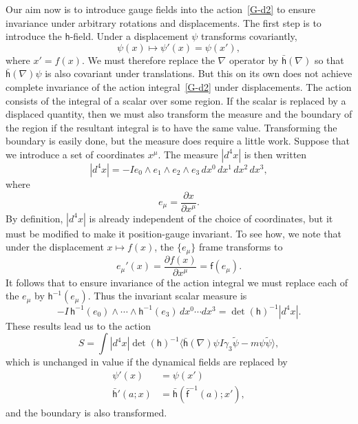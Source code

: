 \documentclass[a4paper]{article}
\numberwithin{equation}{section}
\newcommand{\wdg}{\! \wedge \!}
\newcommand{\la}{\langle}
\newcommand{\ra}{\rangle}
\newcommand{\eqv}{=}
\newcommand{\gk}{\gamma_{3}}
\newcommand{\psirev}{\tilde{\psi}}
\newcommand{\lif}{\mathsf{f}}
\newcommand{\lbf}{\bar{\mathsf{f}}}
\newcommand{\lih}{\mathsf{h}}
\newcommand{\lbh}{\bar{\mathsf{h}}}
\newcommand{\ho}{\lbh}
\newcommand{\hu}{\lih}
\newcommand{\fo}{\lbf}
\newcommand{\fu}{\lif}
\newcommand{\grad}{\nabla}
\newcommand{\deriv}[2]{\frac{\partial #1}{\partial #2}}
\newcommand{\dhi}{\det(\hu)^{-1}}
\begin{document}
Our aim now is to introduce gauge fields into the action~\eqref{G-d2} to
ensure invariance under arbitrary rotations and displacements.  
The first step is to introduce the $\lih$-field.  Under a displacement
$\psi$ transforms covariantly,
%
\begin{equation}
\psi(x) \mapsto \psi'(x) = \psi(x'),
\end{equation}
%
where $x'=f(x)$.  We must therefore replace the $\grad$ operator by
$\ho(\grad)$ so that $\ho(\grad)\psi$ is also covariant under
translations.  But this on its own does not achieve complete
invariance of the action integral~\eqref{G-d2} under displacements.
The action consists of the integral of a scalar over some region.  If
the scalar is replaced by a displaced quantity, then we must also
transform the measure and the boundary of the region if the resultant
integral is to have the same value.  Transforming the boundary is
easily done, but the measure does require a little work.  Suppose that
we introduce a set of coordinates $x^\mu$.  The measure $|d^4x|$ is
then written
%
\begin{equation}
|d^4x| = -I e_0 \wdg e_1 \wdg e_2 \wdg e_3 \, dx^0 \, dx^1\, dx^2\, dx^3,
\end{equation}
%
where
%
\begin{equation}
e_\mu \eqv \deriv{x}{x^\mu}.
\end{equation}
%
By definition, $|d^4x|$ is already independent of the choice of
coordinates, but it must be modified to make it position-gauge
invariant.  To see how, we note that under the displacement $x\mapsto
f(x)$, the $\{e_\mu\}$ frame transforms to
%
\begin{equation}
e_\mu' (x) = \deriv{f(x)}{x^\mu} = \fu(e_\mu).
\end{equation}
%
It follows that to ensure invariance of the action integral we must
replace each of the $e_\mu$ by $\hu^{-1}(e_\mu)$.  Thus the invariant
scalar measure is
%
\begin{equation}
-I \, \hu^{-1}(e_0) \wdg \cdots \wdg
\hu^{-1}(e_3) \, dx^0 \cdots dx^3 = \dhi |d^4x|.
\end{equation}
%
These results lead us to the action
%
\begin{equation}
S= \int |d^4 x| \dhi \la \ho(\grad) \psi I\gk \psirev - m
\psi \psirev \ra ,
\label{G-d4} 
\end{equation}
%
which is unchanged in value if the dynamical fields are replaced by 
%
\begin{align}
\psi'(x) &\eqv \psi(x') \\
\ho'(a;x)  &\eqv \ho(\fo^{-1}(a);x') ,
\end{align}
%
and the boundary is also transformed.
\end{document}
